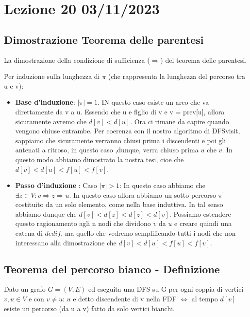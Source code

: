 \section{Lezione 20 03/11/2023}

\subsection{Dimostrazione Teorema delle parentesi}

La dimostrazione della condizione di sufficienza ($\Rightarrow$) del teorema delle parentesi.

Per induzione sulla lunghezza di $\pi$ (che rappresenta la lunghezza del percorso tra u e v):

\begin{itemize}
	\item \textbf{Base d'induzione}: $|\pi| = 1$. IN questo caso esiste un arco che va direttamente da v a u. Essendo che u e figlio di v e v = prev[u], allora sicuramente avremo che $d[v] < d[u]$. Ora ci rimane da capire quando vengono chiuse entrambe. Per coerenza con il nostro algoritmo di DFSvisit, sappiamo che sicuramente verranno chiusi prima i discendenti e poi gli antenati a ritroso, in questo caso ,dunque, verra chiuso prima $u$ che $v$.
	In questo modo abbiamo dimostrato la nostra tesi, cioe che $d[v] < d[u] < f[u] < f[v]$.
	\item \textbf{Passo d'induzione} : Caso $|\pi| > 1$:
	In questo caso abbiamo che $\exists z \in V: v\Rightarrow z \Rightarrow u$. In questo caso allora abbiamo un sotto-percorso $\pi^{\prime}$ costituito da un solo elemento, come nella base induttiva. In tal senso abbiamo dunque che $d[v] < d[z] < d[z] < d[v]$.
	Possiamo estendere questo ragionamento agli n nodi che dividono $v$ da $u$ e creare quindi una catena di $d e di f$, ma quello che vedremo semplificando tutti i nodi che non interessano alla dimostrazione che $d[v] < d[u] < f[u] < f[v]$.
\end{itemize}





\subsection{Teorema del percorso bianco - Definizione}

Dato un grafo $G = (V,E)$ ed eseguita una DFS su G per ogni coppia di vertici $v,u \in V$ e con $v \neq u$: \newline
$u$ e detto discendente di v nella FDF $ \iff $ al tempo $d[v]$ esiste un percorso (da u a v) fatto da solo vertici bianchi.


